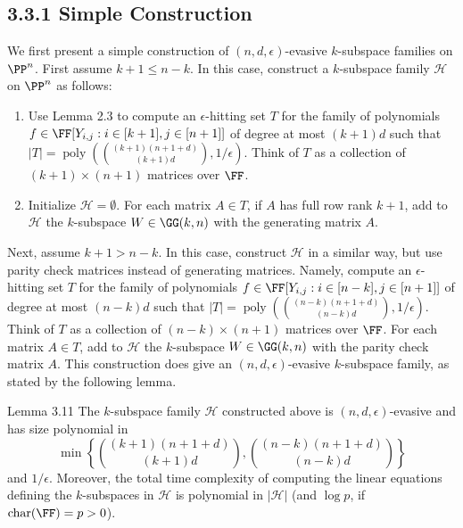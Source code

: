 \subsection*{3.3.1 Simple Construction}
We first present a simple construction of $(n,d,\epsilon)$-evasive $k$-subspace families on $\PP^n$.
First assume $k+1\le n-k$. In this case, construct a $k$-subspace family $\mathcal H$ on $\PP^n$ as follows:
\begin{enumerate}
\item Use Lemma 2.3 to compute an $\epsilon$-hitting set $T$ for the family of polynomials $f\in\FF[Y_{i,j}:i\in[k+1],j\in[n+1]]$ of degree at most $(k+1)d$ such that $|T|=\operatorname{poly}(\binom{(k+1)(n+1+d)}{(k+1)d},1/\epsilon)$. Think of $T$ as a collection of $(k+1)\times(n+1)$ matrices over $\FF$.
\item Initialize $\mathcal H=\emptyset$. For each matrix $A\in T$, if $A$ has full row rank $k+1$, add to $\mathcal H$ the $k$-subspace $W\in\GG(k,n)$ with the generating matrix $A$.
\end{enumerate}
Next, assume $k+1>n-k$. In this case, construct $\mathcal H$ in a similar way, but use parity check matrices instead of generating matrices. Namely, compute an $\epsilon$-hitting set $T$ for the family of polynomials $f\in\FF[Y_{i,j}:i\in[n-k],j\in[n+1]]$ of degree at most $(n-k)d$ such that $|T|=\operatorname{poly}(\binom{(n-k)(n+1+d)}{(n-k)d},1/\epsilon)$. Think of $T$ as a collection of $(n-k)\times(n+1)$ matrices over $\FF$. For each matrix $A\in T$, add to $\mathcal H$ the $k$-subspace $W\in\GG(k,n)$ with the parity check matrix $A$.
This construction does give an $(n,d,\epsilon)$-evasive $k$-subspace family, as stated by the following lemma.
\begin{result}{Lemma 3.11}
The $k$-subspace family $\mathcal H$ constructed above is $(n,d,\epsilon)$-evasive and has size polynomial in
\[\min\left\{\binom{(k+1)(n+1+d)}{(k+1)d},\binom{(n-k)(n+1+d)}{(n-k)d}\right\}\]
and $1/\epsilon$. Moreover, the total time complexity of computing the linear equations defining the $k$-subspaces in $\mathcal H$ is polynomial in $|\mathcal H|$ (and $\log p$, if $\operatorname{char}(\FF)=p>0$).
\end{result}
